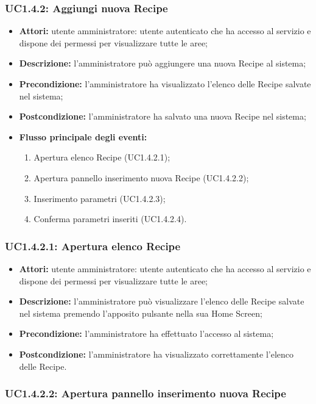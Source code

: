 \subsubsection{UC1.4.2: Aggiungi nuova Recipe}
\begin{itemize}
    \item \textbf{Attori:} utente amministratore: utente autenticato che ha accesso al servizio e dispone dei permessi per visualizzare tutte le aree;
    \item \textbf{Descrizione:} l'amministratore può aggiungere una nuova Recipe al sistema;
    \item \textbf{Precondizione:} l'amministratore ha visualizzato l'elenco delle Recipe salvate nel sistema;
    \item \textbf{Postcondizione:} l'amministratore ha salvato una nuova Recipe nel sistema;
	\item \textbf{Flusso principale degli eventi:}
    \begin{enumerate}
        \item Apertura elenco Recipe (UC1.4.2.1);
        \item Apertura pannello inserimento nuova Recipe (UC1.4.2.2);
        \item Inserimento parametri (UC1.4.2.3);
        \item Conferma parametri inseriti (UC1.4.2.4).
    \end{enumerate}
\end{itemize}
\subsubsection{UC1.4.2.1: Apertura elenco Recipe}

\begin{itemize}
    \item \textbf{Attori:} utente amministratore: utente autenticato che ha accesso al servizio e dispone dei permessi per visualizzare tutte le aree;
    \item \textbf{Descrizione:} l'amministratore può visualizzare l'elenco delle Recipe salvate nel sistema premendo l'apposito pulsante nella sua Home Screen;
    \item \textbf{Precondizione:} l'amministratore ha effettuato l'accesso al sistema;
    \item \textbf{Postcondizione:} l'amministratore ha visualizzato correttamente l'elenco delle Recipe.
\end{itemize}

\subsubsection{UC1.4.2.2: Apertura pannello inserimento nuova Recipe}

